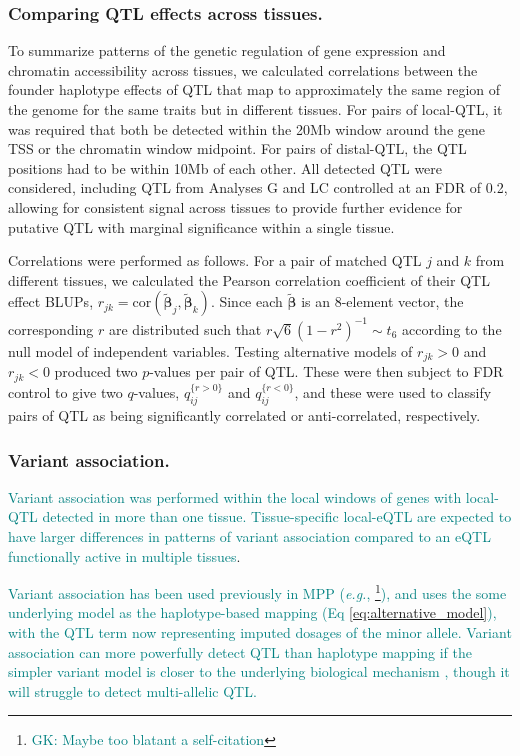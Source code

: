 \documentclass[9pt,twocolumn,twoside]{gsajnl}
\newcommand{\eg}{\emph{e.g.}\xspace}
\newcommand{\bbeta}{\boldsymbol{\beta}}
\newcommand{\blup}{\widetilde{\bbeta}}
\newcommand{\WV}[2]{\textcolor{red}{#1\footnote{\textcolor{red}{WV: #2}}}}
\newcommand{\GK}[2]{\textcolor{teal}{#1\footnote{\textcolor{teal}{GK: #2}}}}
\newcommand{\GKinline}[1]{\textcolor{teal}{#1}}
\begin{document}
\subsubsection{Comparing QTL effects across tissues.}

To summarize patterns of the genetic regulation of gene expression and chromatin accessibility across tissues, we calculated correlations between the founder haplotype effects of QTL that map to approximately the same region of the genome for the same traits but in different tissues. For pairs of local-QTL, it was required that both be detected within the 20Mb window around the gene TSS or the chromatin window midpoint. For pairs of distal-QTL, the QTL positions had to be within 10Mb of each other. All detected QTL were considered, including QTL from Analyses G and LC controlled at an FDR of 0.2, allowing for consistent signal across tissues to provide further evidence for putative QTL with marginal significance within a single tissue.

Correlations were performed as follows. For a pair of matched QTL $j$ and $k$ from different tissues, we calculated the Pearson correlation coefficient of their QTL effect BLUPs, $r_{jk} = \text{cor}(\blup_j, \blup_k)$. Since each $\blup$ is an 8-element vector, the corresponding $r$ are distributed such that $r\sqrt{6}(1 - r^{2})^{-1} \sim t_{6}$ according to the null model of independent variables. Testing alternative models of $r_{jk} > 0$ and $r_{jk} < 0$ produced two $p$-values per pair of QTL. These were then subject to FDR control \citep{Benjamini1995} to give two $q$-values, $q_{ij}^{\{r > 0\}}$ and $q_{ij}^{\{r < 0\}}$, and these were used to classify pairs of QTL as being significantly correlated or anti-correlated, respectively. 

\subsubsection{Variant association.}

\GKinline{Variant association was performed within the local windows of genes with local-QTL detected in more than one tissue. Tissue-specific local-eQTL are expected to have larger differences in patterns of variant association compared to an eQTL functionally active in multiple tissues}. 

\GKinline{Variant association has been used previously in MPP (\eg, \citealt{Baud2014, Keele2018}\GK{}{Maybe too blatant a self-citation}), and uses the some underlying model as the haplotype-based mapping (Eq \ref{eq:alternative_model}), with the QTL term now representing imputed dosages of the minor allele. Variant association can more powerfully detect QTL than haplotype mapping if the simpler variant model is closer to the underlying biological mechanism \citep{Yalcin2005}, though it will struggle to detect multi-allelic QTL.} 
\end{document}

